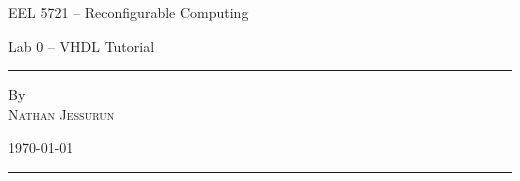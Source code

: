 \hypersetup{pageanchor=false}
\begin{titlepage} %
  \centering %
  
  \vspace*{0.1\textheight}
  \large{EEL 5721 -- Reconfigurable Computing}\\
  \vspace{0.0025\textheight}
  
  \huge{Lab 0 -- VHDL Tutorial}
  \vspace{0.025\textheight} %
  
  \rule{0.3\textwidth}{0.4pt} %
  \vspace{0.1\textheight} %
  
  \small{By}\\
  \Large \textsc{Nathan Jessurun}\\%
  \vspace{0.04\textheight}
  
  \vspace{0.10\textheight}
  \normalsize{
    \today
  }
  \vfill %
  
  \rule{\textwidth}{0.4pt} %
\end{titlepage}
\hypersetup{pageanchor=true}